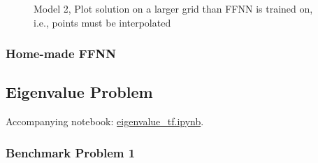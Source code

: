 \begin{figure}[H]
\caption{Model 2, Plot solution on a larger grid than FFNN is trained on, i.e., points must be interpolated}
\label{fig:heat_nn4}
\end{figure}

\subsubsection{Home-made FFNN}


\subsection{Eigenvalue Problem}\label{sec:eigenvalue results}

Accompanying notebook: \href{https://github.com/nicolossus/FYS-STK4155-Project3/blob/master/notebooks/eigenvalue_tf.ipynb}{eigenvalue\_tf.ipynb}.

\subsubsection{Benchmark Problem 1}

